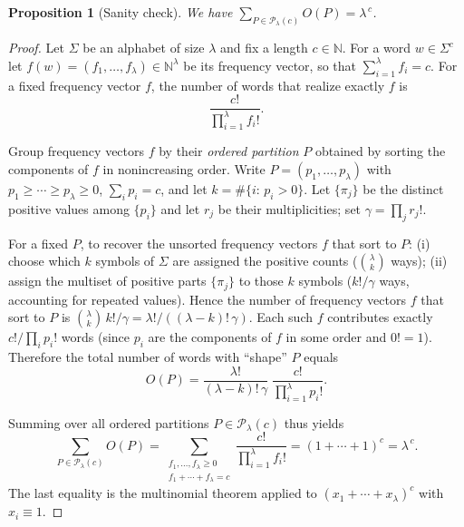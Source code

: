 \documentclass{article}
\newtheorem{proposition}{Proposition}[section]
\theoremstyle{remark}
\begin{document}
\begin{proposition}[Sanity check]
\label{prop:sumOP}
We have \(\displaystyle \sum_{P\in\mathcal{P}_{\lambda}(c)} O(P) = \lambda^{\,c}\).
\end{proposition}

\begin{proof}
Let \(\Sigma\) be an alphabet of size \(\lambda\) and fix a length \(c\in\mathbb{N}\).
For a word \(w\in\Sigma^{c}\) let \(f(w)=(f_1,\dots,f_\lambda)\in\mathbb{N}^\lambda\) be its
frequency vector, so that \(\sum_{i=1}^\lambda f_i=c\).
For a fixed frequency vector \(f\), the number of words that realize exactly \(f\) is
\begin{equation}
\frac{c!}{\prod_{i=1}^\lambda f_i!}.
\end{equation}

Group frequency vectors \(f\) by their \emph{ordered partition} \(P\) obtained by sorting
the components of \(f\) in nonincreasing order. Write
\(P=(p_1,\dots,p_\lambda)\) with \(p_1\ge\cdots\ge p_\lambda\ge 0\),
\(\sum_i p_i=c\), and let \(k=\#\{i:\,p_i>0\}\).
Let \(\{\pi_j\}\) be the distinct positive values among \(\{p_i\}\) and
let \(r_j\) be their multiplicities; set \(\gamma=\prod_j r_j!\).

For a fixed \(P\), to recover the unsorted frequency vectors \(f\) that sort to \(P\):
(i) choose which \(k\) symbols of \(\Sigma\) are assigned the positive counts
(\(\binom{\lambda}{k}\) ways); (ii) assign the multiset of positive parts
\(\{\pi_j\}\) to those \(k\) symbols (\(k!/\gamma\) ways, accounting for repeated
values). Hence the number of frequency vectors \(f\) that sort to \(P\) is
\(\binom{\lambda}{k}\,k!/\gamma=\lambda!/((\lambda-k)!\,\gamma)\).
Each such \(f\) contributes exactly \(c!/\prod_i p_i!\) words (since \(p_i\) are
the components of \(f\) in some order and \(0!=1\)).
Therefore the total number of words with “shape” \(P\) equals
\begin{equation}
O(P)=\frac{\lambda!}{(\lambda-k)!\,\gamma}\;\frac{c!}{\prod_{i=1}^{\lambda} p_i!}.
\end{equation}

Summing over all ordered partitions \(P\in\mathcal{P}_{\lambda}(c)\) thus yields
\begin{equation}
\sum_{P\in\mathcal{P}_{\lambda}(c)} O(P)
=\sum_{\substack{f_1,\dots,f_\lambda\ge 0\\ f_1+\cdots+f_\lambda=c}}
\frac{c!}{\prod_{i=1}^\lambda f_i!}
=(1+\cdots+1)^c=\lambda^{\,c}.
\end{equation}
The last equality is the multinomial theorem applied to
\((x_1+\cdots+x_\lambda)^c\) with \(x_i\equiv 1\).
\end{proof}
\end{document}
